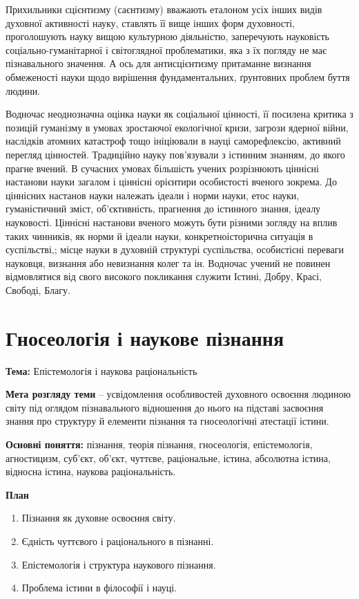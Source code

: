 Прихильники сцієнтизму (саєнтизму) вважають еталоном усіх інших видів
духовної активності науку, ставлять її вище інших форм духовності,
проголошують науку вищою культурною діяльністю, заперечують науковість
соціально-гуманітарної і світоглядної проблематики, яка з їх погляду не має
пізнавального значення. А ось для антисцієнтизму притаманне визнання
обмеженості науки щодо вирішення фундаментальних, ґрунтовних проблем
буття людини.

Водночас неоднозначна оцінка науки як соціальної цінності, її посилена
критика з позицій гуманізму в умовах зростаючої екологічної кризи, загрози
ядерної війни, наслідків атомних катастроф тощо ініціювали в науці
саморефлексію, активний перегляд цінностей. Традиційно науку пов’язували з
істинним знанням, до якого прагне вчений. В сучасних умовах більшість
учених розрізнюють ціннісні настанови науки загалом і ціннісні орієнтири
особистості вченого зокрема. До ціннісних настанов науки належать ідеали і
норми науки, етос науки, гуманістичний зміст, об’єктивність, прагнення до
істинного знання, ідеалу науковості. Ціннісні настанови вченого можуть бути
різними зогляду на вплив таких чинників, як норми й ідеали науки, конкретноісторична ситуація в суспільстві,; місце науки в духовній структурі суспільства,
особистісні переваги науковця, визнання або невизнання колег та ін. Водночас
учений не повинен відмовлятися від свого високого покликання служити
Істині, Добру, Красі, Свободі, Благу.

\section{Гносеологія і наукове пізнання}

\textbf{Тема:} Епістемологія і наукова раціональність

\textbf{Мета розгляду теми} – усвідомлення особливостей духовного освоєння
людиною світу під оглядом пізнавального відношення до нього на підставі
засвоєння знання про структуру й елементи пізнання та гносеологічні атестації
істини.

\textbf{Основні поняття:} пізнання, теорія пізнання, гносеологія, епістемологія,
агностицизм, суб’єкт, об’єкт, чуттєве, раціональне, істина, абсолютна істина,
відносна істина, наукова раціональність.

\textbf{План}
\begin{enumerate}
	\item Пізнання як духовне освоєння світу.
	
	\item Єдність чуттєвого і раціонального в пізнанні.
	
	\item Епістемологія і структура наукового пізнання.
	
	\item Проблема істини в філософії і науці.
\end{enumerate}

